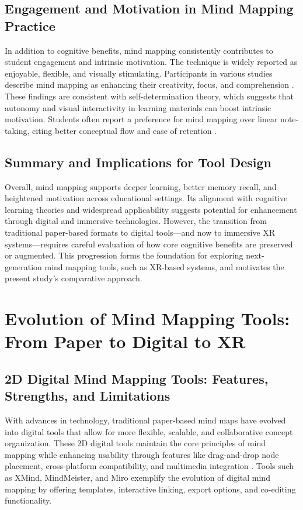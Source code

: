 \documentclass{CPP}
\begin{document}
\subsection{Engagement and Motivation in Mind Mapping Practice}

In addition to cognitive benefits, mind mapping consistently contributes to student engagement and intrinsic motivation. The technique is widely reported as enjoyable, flexible, and visually stimulating. Participants in various studies describe mind mapping as enhancing their creativity, focus, and comprehension \citep{Cerkez2023, Deka2019}. These findings are consistent with self-determination theory, which suggests that autonomy and visual interactivity in learning materials can boost intrinsic motivation. Students often report a preference for mind mapping over linear note-taking, citing better conceptual flow and ease of retention \citep{Muchhal2018}.

\subsection{Summary and Implications for Tool Design}

Overall, mind mapping supports deeper learning, better memory recall, and heightened motivation across educational settings. Its alignment with cognitive learning theories and widespread applicability suggests potential for enhancement through digital and immersive technologies. However, the transition from traditional paper-based formats to digital tools—and now to immersive XR systems—requires careful evaluation of how core cognitive benefits are preserved or augmented. This progression forms the foundation for exploring next-generation mind mapping tools, such as XR-based systems, and motivates the present study’s comparative approach.


\section{Evolution of Mind Mapping Tools: From Paper to Digital to XR}

\subsection{2D Digital Mind Mapping Tools: Features, Strengths, and Limitations}

With advances in technology, traditional paper-based mind maps have evolved into digital tools that allow for more flexible, scalable, and collaborative concept organization. These 2D digital tools maintain the core principles of mind mapping while enhancing usability through features like drag-and-drop node placement, cross-platform compatibility, and multimedia integration \citep{Amelina2023, Bhattacharya2020}. Tools such as XMind, MindMeister, and Miro exemplify the evolution of digital mind mapping by offering templates, interactive linking, export options, and co-editing functionality.
\end{document}
